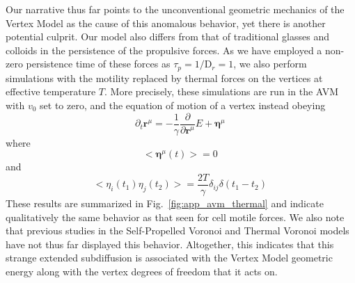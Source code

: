 \documentclass[
reprint
,aps
,amssymb
,amsmath
,superscriptaddress
]{revtex4-1}
\begin{document}
Our narrative thus far points to the unconventional geometric mechanics of the Vertex Model as the cause of this anomalous behavior, yet there is another potential culprit. Our model also differs from that of traditional glasses and colloids in the persistence of the propulsive forces. As we have employed a non-zero persistence time of these forces as $\tau_p = 1/\mathrm{D}_r = 1$, we also perform simulations with the motility replaced by thermal forces on the vertices at effective temperature $T$. More precisely, these simulations are run in the AVM with $v_0$ set to zero, and the equation of motion of a vertex instead obeying
%
\begin{equation}\label{eq:app_thermalvertex}
\partial_t \mathbf{r}^\mu = -\frac{1}{\gamma} \frac{\partial}{\partial\mathbf{r}^\mu} E + \mathbf{\eta}^{\mu} \,   
\end{equation}
%
where
%
\begin{equation}\label{eq:app_brownian_average}
<\mathbf{\eta}^{\mu}(t)> = 0\, 
\end{equation}
% 
and
%
\begin{equation}\label{eq:app_brownian_variance}
<\eta_i(t_1)\eta_j(t_2)> = \frac{2 T}{\gamma} \delta_{ij} \delta(t_1 - t_2) \, 
\end{equation}
% 
These results are summarized in Fig.~\ref{fig:app_avm_thermal} and indicate qualitatively the same behavior as that seen for cell motile forces. We also note that previous studies in the Self-Propelled Voronoi and Thermal Voronoi models have not thus far displayed this behavior.  Altogether, this indicates that this strange extended subdiffusion is associated with the Vertex Model geometric energy along with the vertex degrees of freedom that it acts on.
\end{document}

